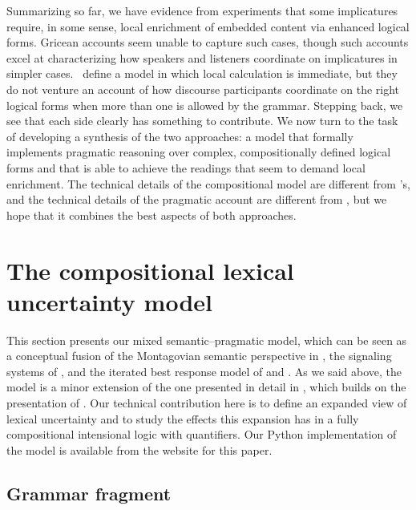 \documentclass[leqno]{article}
\begin{document}
Summarizing so far, we have evidence from
 experiments that some implicatures
require, in some sense, local enrichment of embedded content via
enhanced logical forms. Gricean accounts seem unable to capture such
cases, though such accounts excel at characterizing how speakers and
listeners coordinate on implicatures in simpler cases. \CFS\ define a
model in which local calculation is immediate, but they do not venture
an account of how discourse participants coordinate on the right
logical forms when more than one is allowed by the grammar. Stepping
back, we see that each side clearly has something to contribute. We
now turn to the task of developing a synthesis of the two approaches:
a model that formally implements pragmatic reasoning over complex,
compositionally defined logical forms and that is able to achieve the
readings that seem to demand local enrichment. The technical details
of the compositional model are different from \CFS's, and the
technical details of the pragmatic account are different from
\citeauthor{Grice75}, but we hope that it combines the best aspects of
both approaches.


\section{The compositional lexical uncertainty model}\label{sec:model}

This section presents our mixed semantic--pragmatic model, which can
be seen as a conceptual fusion of the Montagovian semantic perspective
in \citet{Lewis70GS}, the signaling systems of \citet{Lewis69}, and
the iterated best response model of \citet{Jaeger:2007,Jaeger:2011}
and \citet{Franke09DISS}. As we said above, the model is a minor
extension of the one presented in detail in
\citet{Bergen:Levy:Goodman:2014}, which builds on the presentation of
\citet{Bergen:Goodman:Levy:2012}. Our technical contribution here is
to define an expanded view of lexical uncertainty and to study the
effects this expansion has in a fully compositional intensional logic
with quantifiers. Our Python implementation of the model is available
from the website for this paper.


\subsection{Grammar fragment}\label{sec:grammar}
\end{document}
